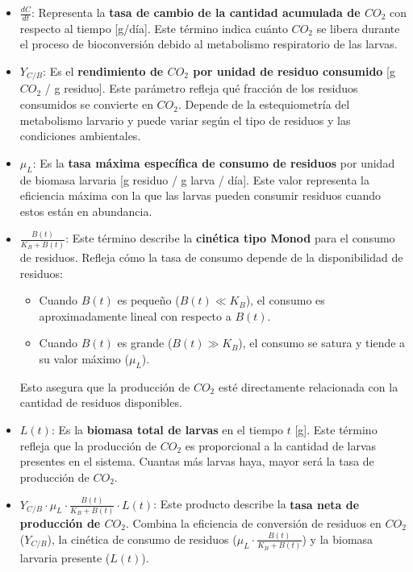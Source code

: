 \documentclass[12pt]{article}
\begin{document}
\begin{itemize}
    \item $\frac{dC}{dt}$: Representa la \textbf{tasa de cambio de la cantidad acumulada de $CO_2$} con respecto al tiempo [g/día]. Este término indica cuánto $CO_2$ se libera durante el proceso de bioconversión debido al metabolismo respiratorio de las larvas.

    \item $Y_{C/B}$: Es el \textbf{rendimiento de $CO_2$ por unidad de residuo consumido} [g $CO_2$ / g residuo]. Este parámetro refleja qué fracción de los residuos consumidos se convierte en $CO_2$. Depende de la estequiometría del metabolismo larvario y puede variar según el tipo de residuos y las condiciones ambientales.

    \item $\mu_L$: Es la \textbf{tasa máxima específica de consumo de residuos} por unidad de biomasa larvaria [g residuo / g larva / día]. Este valor representa la eficiencia máxima con la que las larvas pueden consumir residuos cuando estos están en abundancia.

    \item $\frac{B(t)}{K_B + B(t)}$: Este término describe la \textbf{cinética tipo Monod} para el consumo de residuos. Refleja cómo la tasa de consumo depende de la disponibilidad de residuos:
    \begin{itemize}
        \item Cuando $B(t)$ es pequeño ($B(t) \ll K_B$), el consumo es aproximadamente lineal con respecto a $B(t)$.
        \item Cuando $B(t)$ es grande ($B(t) \gg K_B$), el consumo se satura y tiende a su valor máximo ($\mu_L$).
    \end{itemize}
    Esto asegura que la producción de $CO_2$ esté directamente relacionada con la cantidad de residuos disponibles.

    \item $L(t)$: Es la \textbf{biomasa total de larvas} en el tiempo $t$ [g]. Este término refleja que la producción de $CO_2$ es proporcional a la cantidad de larvas presentes en el sistema. Cuantas más larvas haya, mayor será la tasa de producción de $CO_2$.

    \item $Y_{C/B} \cdot \mu_L \cdot \frac{B(t)}{K_B + B(t)} \cdot L(t)$: Este producto describe la \textbf{tasa neta de producción de $CO_2$}. Combina la eficiencia de conversión de residuos en $CO_2$ ($Y_{C/B}$), la cinética de consumo de residuos ($\mu_L \cdot \frac{B(t)}{K_B + B(t)}$) y la biomasa larvaria presente ($L(t)$).
\end{itemize}
\end{document}
